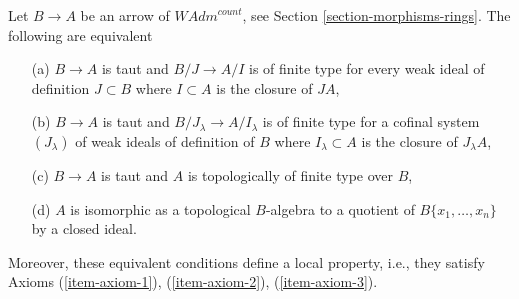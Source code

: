 \begin{lemma}
\label{lemma-quotient-restricted-power-series}
Let $B \to A$ be an arrow of $\textit{WAdm}^{count}$, see
Section \ref{section-morphisms-rings}.
The following are equivalent
\begin{enumerate}
\item[(a)] $B \to A$ is taut and $B/J \to A/I$ is of finite type for
every weak ideal of definition $J \subset B$ where $I \subset A$ is the
closure of $JA$,
\item[(b)] $B \to A$ is taut and $B/J_\lambda \to A/I_\lambda$
is of finite type for a cofinal system $(J_\lambda)$
of weak ideals of definition of $B$ where
$I_\lambda \subset A$ is the closure of $J_\lambda A$,
\item[(c)] $B \to A$ is taut and $A$ is topologically of finite
type over $B$,
\item[(d)] $A$ is isomorphic as a topological $B$-algebra to a quotient of
$B\{x_1, \ldots, x_n\}$ by a closed ideal.
\end{enumerate}
Moreover, these equivalent conditions define a local property,
i.e., they satisfy
Axioms (\ref{item-axiom-1}), (\ref{item-axiom-2}), (\ref{item-axiom-3}).
\end{lemma}

